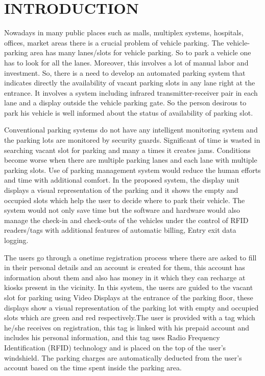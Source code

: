 \documentclass[12pt,a4paper]{report}
\begin{document}
\thispagestyle{fancy}
\chapter{INTRODUCTION}
	\newpage
	\vspace{0.5cm}
Nowadays in many public places such as malls, multiplex systems, hospitals, offices, market areas there is a crucial problem of vehicle  parking. The vehicle-parking area has many lanes/slots for vehicle parking. So to park a vehicle one has to look for all the lanes. 
Moreover, this involves a lot of manual labor and investment. So, there  is a need to develop an automated parking system that indicates
directly the availability of vacant parking slots in any lane right at the entrance. It involves a system including infrared transmitter-receiver pair in each lane and a display outside the vehicle parking gate. So the person desirous to park his vehicle is well informed about the status of
availability of parking slot. 
\par Conventional parking systems do not have any intelligent monitoring system and the parking lots are monitored by security guards. Significant of time is wasted in searching vacant slot for parking and  many a times it creates jams. Conditions become worse when there  are multiple parking lanes and each lane with multiple parking slots.  Use of parking management system would reduce the human efforts  and time with additional comfort. In the proposed system, the display  unit displays a visual representation of the parking and it shows the  empty and occupied slots which help the user to decide where to park their vehicle. The system  would  not  only  save  time  but  the software  and  hardware  would  also  manage  the  check-in  and 
check-outs of the vehicles under the control of RFID readers/tags with additional features of automatic billing, Entry exit data logging.

\par The users go through a onetime registration  process where there  are  asked to fill in their personal  details and an account is  created  for  them,  this  account  has  information  about  them and also  has  money  in  it  which  they  can  recharge  at  kiosks present in the  vicinity. In this system, the  users are  guided to the   vacant  slot   for  parking  using  Video  Displays at the entrance  of the parking floor, these displays show a visual representation of the  parking lot with empty and occupied slots which are green and red respectively.The user is provided with a tag which he/she receives on registration, this tag is linked with his prepaid account and includes his personal information, and this tag uses Radio Frequency  Identification 
(RFID)  technology  and  is  placed  on  the  top  of  the  user’s 	windshield. The parking charges are automatically deducted from the user’s account  based  on  the  time  spent  inside  the parking area. \newpage
\end{document}
